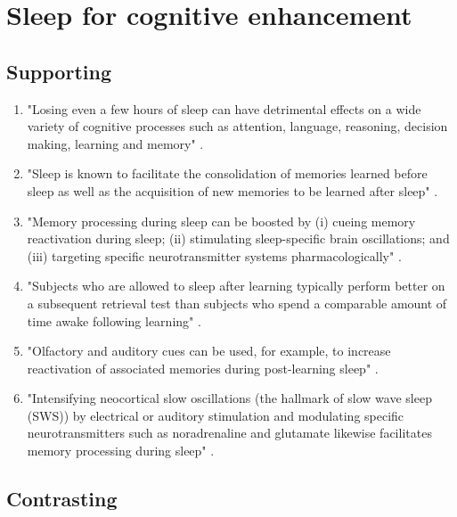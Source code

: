\section{Sleep for cognitive enhancement \parencite{6}}

\begin{centering}\subsection{Supporting}\end{centering}

\begin{enumerate}

    \item "Losing even a few hours of sleep can have detrimental effects on a wide variety of cognitive processes such as attention, language, reasoning, decision making, learning and memory" \parencite{6}.

    \item "Sleep is known to facilitate the consolidation of memories learned before sleep as well as the acquisition of new memories to be learned after sleep" \parencite{6}.

    \item "Memory processing during sleep can be boosted by (i) cueing memory reactivation during sleep; (ii) stimulating sleep-specific brain oscillations; and (iii) targeting specific neurotransmitter systems pharmacologically" \parencite{6}.

    \item "Subjects who are allowed to sleep after learning typically perform better on a subsequent retrieval test than subjects who spend a comparable amount of time awake following learning" \parencite{6}.

    \item "Olfactory and auditory cues can be used, for example, to increase reactivation of associated memories during post-learning sleep" \parencite{6}.

    \item "Intensifying neocortical slow oscillations (the hallmark of slow wave sleep (SWS)) by electrical or auditory stimulation and modulating specific neurotransmitters such as noradrenaline and glutamate likewise facilitates memory processing during sleep" \parencite{6}.

\end{enumerate}

\begin{centering}\subsection{Contrasting}\end{centering}

